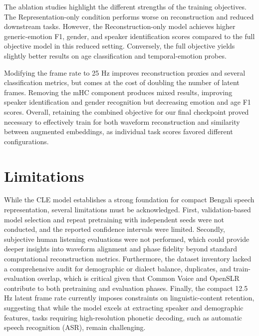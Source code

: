 The ablation studies highlight the different strengths of the training objectives. The Representation-only condition performs worse on reconstruction and reduced downstream tasks. However, the Reconstruction-only model achieves higher generic-emotion F1, gender, and speaker identification scores compared to the full objective model in this reduced setting. Conversely, the full objective yields slightly better results on age classification and temporal-emotion probes.

Modifying the frame rate to 25 Hz improves reconstruction proxies and several classification metrics, but comes at the cost of doubling the number of latent frames. Removing the mHC component produces mixed results, improving speaker identification and gender recognition but decreasing emotion and age F1 scores. Overall, retaining the combined objective for our final checkpoint proved necessary to effectively train for both waveform reconstruction and similarity between augmented embeddings, as individual task scores favored different configurations.

\section{Limitations}
While the CLE model establishes a strong foundation for compact Bengali speech representation, several limitations must be acknowledged. First, validation-based model selection and repeat pretraining with independent seeds were not conducted, and the reported confidence intervals were limited. Secondly, subjective human listening evaluations were not performed, which could provide deeper insights into waveform alignment and phase fidelity beyond standard computational reconstruction metrics. Furthermore, the dataset inventory lacked a comprehensive audit for demographic or dialect balance, duplicates, and train-evaluation overlap, which is critical given that Common Voice and OpenSLR contribute to both pretraining and evaluation phases. Finally, the compact 12.5 Hz latent frame rate currently imposes constraints on linguistic-content retention, suggesting that while the model excels at extracting speaker and demographic features, tasks requiring high-resolution phonetic decoding, such as automatic speech recognition (ASR), remain challenging.